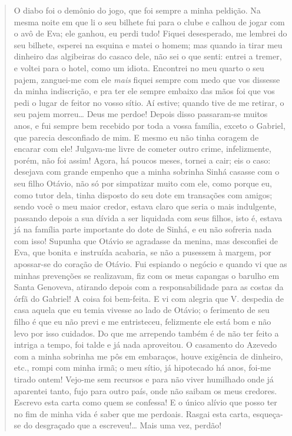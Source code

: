 {\begin{quote}
O diabo foi o demônio do jogo, que foi sempre a minha
peldição. Na mesma noite em que li o seu bilhete fui para o clube e
calhou de jogar com o avô de Eva; ele ganhou, eu perdi tudo!
Fiquei desesperado, me lembrei do seu bilhete, esperei na esquina e
matei o homem; mas quando ia tirar meu dinheiro das algibeiras do casaco
dele, não sei o que senti: entrei a tremer, e voltei para o hotel, como
um idiota. Encontrei no meu quarto o seu pajem, zanguei-me com
ele \emph{mais} fiquei sempre com medo que vos dissesse da minha
indiscrição, e pra ter ele sempre embaixo das mãos foi que vos
pedi o lugar de feitor no vosso sítio. Aí estive; quando tive
de me retirar, o seu pajem morreu\ldots{} Deus me perdoe!
Depois disso passaram-se muitos anos, e fui sempre bem recebido por toda
a vossa família, exceto o Gabriel, que parecia desconfiado de
mim. E mesmo eu não tinha coragem de encarar com ele! Julgava-me livre
de cometer outro crime, infelizmente, porém, não foi assim! Agora,
há poucos meses, tornei a cair; eis o caso: desejava com grande
empenho que a minha sobrinha Sinhá casasse com o seu filho
Otávio, não só por simpatizar muito com ele, como porque eu,
como tutor dela, tinha disposto do seu dote em transações com amigos;
sendo você o meu maior credor, estava claro que seria o mais indulgente,
passando depois a sua dívida a ser liquidada com seus filhos,
isto é, estava já na família parte importante do dote de Sinhá,
e eu não sofreria nada com isso! Supunha que Otávio se
agradasse da menina, mas desconfiei de Eva, que bonita e
instruída acabaria, se não a pusessem à margem, por
apossar-se do coração de Otávio. Fui espiando o
negócio e quando vi que as minhas prevenções se realizavam, fiz
com os meus capangas o barulho em Santa Genoveva, atirando depois com a
responsabilidade para as costas da órfã do Gabriel! A coisa foi
bem-feita. E vi com alegria que V. despedia de casa aquela que eu temia
vivesse ao lado de Otávio; o ferimento de seu filho é
que eu não previ e me entristeceu, felizmente ele está bom e não levo
por isso cuidados. Do que me arrependo também é de não ter feito a
intriga a tempo, foi talde e já nada aproveitou. O casamento do Azevedo
com a minha sobrinha me pôs em embaraços, houve
exigência de dinheiro, etc., rompi com minha irmã; o
meu sítio, já hipotecado há anos, foi-me tirado ontem!
Vejo-me sem recursos e para não viver humilhado onde já aparentei tanto,
fujo para outro país, onde não saibam os meus credores. Escrevo esta
carta como quem se confessa! E o único alívio que
posso ter no fim de minha vida é saber que me perdoais. Rasgai esta
carta, esqueça-se do desgraçado que a escreveu!\ldots{} Mais uma vez,
perdão!


\end{quote}}
